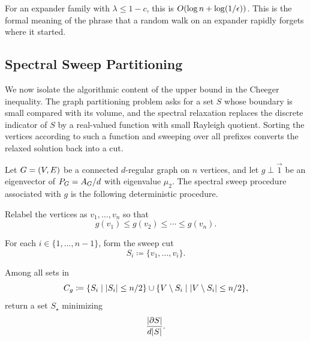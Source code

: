 For an expander family with \(\lambda\leq 1-c\), this is \(\bigO(\log n+\log(1/\epsilon))\). This is the formal meaning of the phrase that a random walk on an expander rapidly forgets where it started.

\subsection{Spectral Sweep Partitioning}
\label{subsec:spectral-sweep-partitioning}

We now isolate the algorithmic content of the upper bound in the Cheeger inequality. The graph partitioning problem asks for a set \(S\) whose boundary is small compared with its volume, and the spectral relaxation replaces the discrete indicator of \(S\) by a real-valued function with small Rayleigh quotient. Sorting the vertices according to such a function and sweeping over all prefixes converts the relaxed solution back into a cut.

\begin{definition}
	\label{def:spectral-sweep-partitioning}
	Let \(G=(V,E)\) be a connected \(d\)-regular graph on \(n\) vertices, and let \(g\perp\vec{1}\) be an eigenvector of \(P_{G}=A_{G}/d\) with eigenvalue \(\mu_2\). The spectral sweep procedure associated with \(g\) is the following deterministic procedure.
	\begin{compactenum}
		\item Relabel the vertices as \(v_1,\ldots,v_n\) so that
		\begin{equation}
			\label{eq:spectral-sweep-order}
			g(v_1)\leq g(v_2)\leq\cdots\leq g(v_n).
		\end{equation}
		\item For each \(i\in\{1,\ldots,n-1\}\), form the sweep cut
		\begin{equation}
			\label{eq:spectral-sweep-prefix}
			S_i\coloneqq \{v_1,\ldots,v_i\}.
		\end{equation}
		\item Among all sets in
		\begin{equation}
			\label{eq:spectral-sweep-candidate-family}
			C_g\coloneqq \{S_i\mid \lvert S_i\rvert\leq n/2\}\cup\{V\setminus S_i\mid \lvert V\setminus S_i\rvert\leq n/2\},
		\end{equation}
		return a set \(S_\star\) minimizing
		\begin{equation}
			\label{eq:spectral-sweep-objective}
			\frac{\lvert\partial S\rvert}{d\lvert S\rvert}.
		\end{equation}
	\end{compactenum}
\end{definition}


